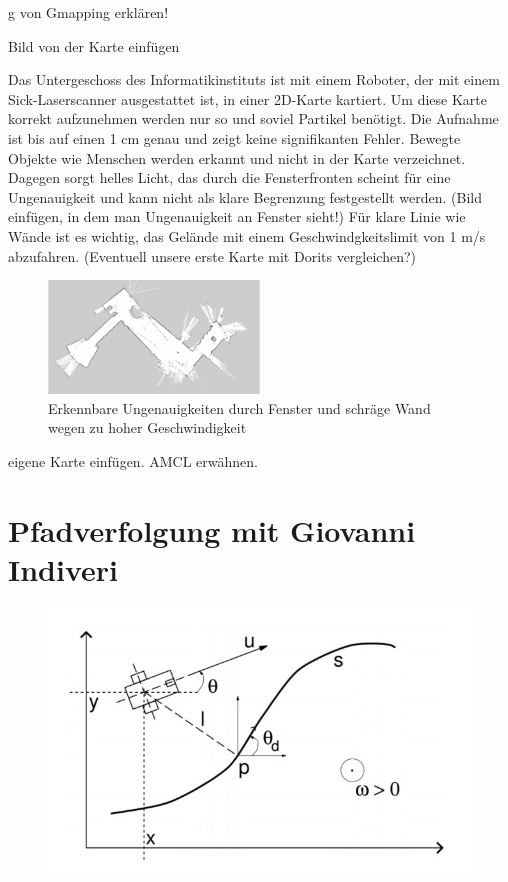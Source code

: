 \documentclass[11pt,a4paper]{article}
\begin{document}
{g von Gmapping erklären!


Bild von der Karte einfügen

Das Untergeschoss des Informatikinstituts ist mit einem Roboter, der mit einem Sick-Laserscanner ausgestattet ist, in einer 2D-Karte kartiert.  Um diese Karte korrekt aufzunehmen werden nur so und soviel Partikel ben\"otigt. Die Aufnahme ist bis auf einen 1 cm genau und zeigt keine signifikanten Fehler. Bewegte Objekte wie Menschen werden erkannt und nicht in der Karte verzeichnet. Dagegen sorgt helles Licht, das durch die Fensterfronten scheint f\"ur eine Ungenauigkeit und kann nicht als klare Begrenzung festgestellt werden.
(Bild einfügen, in dem man Ungenauigkeit an Fenster sieht!) F\"ur klare Linie wie W\"ande ist es wichtig, das Gel\"ande mit einem Geschwindgkeitslimit von 1 m/s abzufahren. (Eventuell unsere erste Karte mit Dorits vergleichen?)

\begin{figure}[h]
	\includegraphics[width=0.5\textwidth]{pictures/firstMap.jpeg}
	\caption{Erkennbare Ungenauigkeiten durch Fenster und schr\"age Wand wegen zu hoher Geschwindigkeit}
\end{figure}


eigene Karte einfügen. AMCL erwähnen.


\section{Pfadverfolgung mit Giovanni Indiveri}
\cite{Giovanni}


\begin{figure}[h]
	\includegraphics[width=\linewidth]{pictures/Pfadverfolgung.JPG}
	\caption{}
\end{figure}

}
\end{document}
